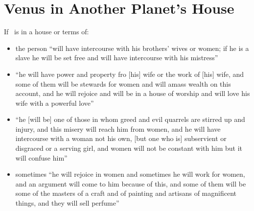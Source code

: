 \section{Venus in Another Planet's House}
If \Venus\, is in a house or terms of:
\begin{itemize}[topsep=0em,itemsep=0em]
\item[\Saturn] the person ``will have intercourse with his brothers' wives or women; if he is a slave he will be set free and will have intercourse with his mistress''

\item[\Jupiter] ``he will have power and property fro [his] wife or the work of [his] wife, and some of them will be stewards for women and will amass wealth on this account, and he will rejoice and will be in a house of worship and will love his wife with a powerful love''

\item[\Mars] ``he [will be] one of those in whom greed and evil quarrels are stirred up and injury, and this misery will reach him from women, and he will have intercourse with a woman not his own, [but one who is] subservient or disgraced or a serving girl, and women will not be constant with him but it will confuse him''

\item[\Mercury] sometimes ``he will rejoice in women and sometimes he will work for women, and an argument will come to him because of this, and some of them will be some of the masters of a craft and of painting and artisans of magnificent things, and they will sell perfume''


\end{itemize}